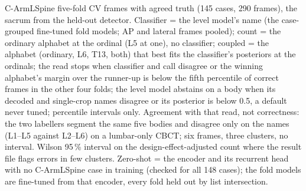 \begin{table}[p]
{\begin{minipage}{23.2cm}
C-ArmLSpine five-fold CV frames with agreed truth (145 cases, 290 frames), the sacrum from the held-out detector. Classifier = the level model's name (the case-grouped fine-tuned fold models; AP and lateral frames pooled); count = the ordinary alphabet at the ordinal (L5 at one), no classifier; coupled = the alphabet (ordinary, L6, T13, both) that best fits the classifier's posteriors at the ordinals; the read stops when classifier and call disagree or the winning alphabet's margin over the runner-up is below the fifth percentile of correct frames in the other four folds; the level model abstains on a body when its decoded and single-crop names disagree or its posterior is below 0.5, a default never tuned; percentile intervals only.
Agreement with that read, not correctness: the two labellers segment the same five bodies and disagree only on the names (L1--L5 against L2--L6) on a lumbar-only CBCT; six frames, three clusters, no interval.
Wilson 95\,\% interval on the design-effect-adjusted count where the result file flags errors in few clusters.
Zero-shot = the encoder and its recurrent head with no C-ArmLSpine case in training (checked for all 148 cases); the fold models are fine-tuned from that encoder, every fold held out by list intersection.
\par\endgroup
\end{minipage}}
\endgroup
\end{table}
